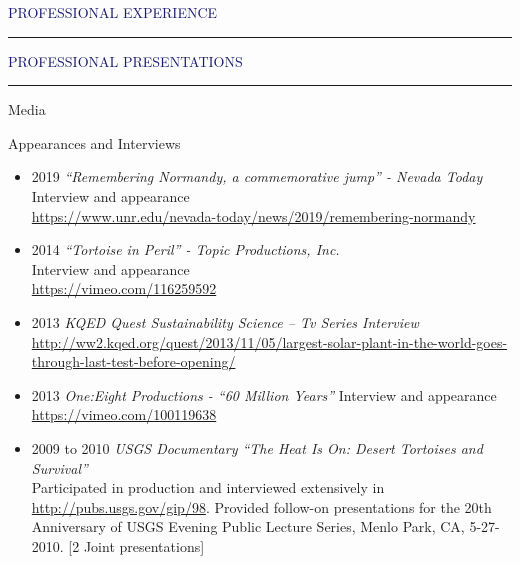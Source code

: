 \documentclass{resume} %
\renewenvironment{rSection}[1]{
\sectionskip
\textcolor{MidnightBlue}{\MakeUppercase{#1}}
\sectionlineskip
\hrule
\begin{list}{}{
\setlength{\leftmargin}{1.5em}
}
\item[]
}{
\end{list}
}
\begin{document}
\begin{rSection}{Professional Experience}
\pagebreak
\begin{rSection}{Professional Presentations}
\begin{refsection}[presentation]

\nocite{*}
%
\printbibliography[heading={subbibliography},title={Presentations},type=inproceedings, prenote=prnote]
\end{refsection}
\begin{refsection}[invited]
\nocite{*}
%
\printbibliography[heading={subbibliography},title={Invited Presentations},type=inproceedings, prenote=prnote]
\end{refsection}
\begin{rSubsection}{Media}{}{}{}
\item Appearances and Interviews
\begin{itemize}
\item  2019 \textit{“Remembering Normandy, a commemorative jump” - Nevada Today}\\
Interview and appearance \\ 
\url{https://www.unr.edu/nevada-today/news/2019/remembering-normandy}
\item  2014 \textit{“Tortoise in Peril” - Topic Productions, Inc.}\\
Interview and appearance \\ 
\url{https://vimeo.com/116259592}
\item 2013 \textit{KQED Quest Sustainability Science – Tv Series Interview} \\ \url{http://ww2.kqed.org/quest/2013/11/05/largest-solar-plant-in-the-world-goes-through-last-test-before-opening/}
\item 2013 \textit{One:Eight Productions - “60 Million Years”} Interview and appearance \\
\url{https://vimeo.com/100119638}
\item 2009 to 2010 \textit{USGS Documentary “The Heat Is On: Desert Tortoises and Survival”} \\Participated in production and interviewed extensively in  \url{http://pubs.usgs.gov/gip/98}. Provided follow-on presentations for the 20th Anniversary of USGS Evening Public Lecture Series, Menlo Park, CA, 5-27-2010. [2 Joint presentations]

\end{itemize}
\end{rSubsection}
\end{rSection}
\end{rSection}
\end{document}
